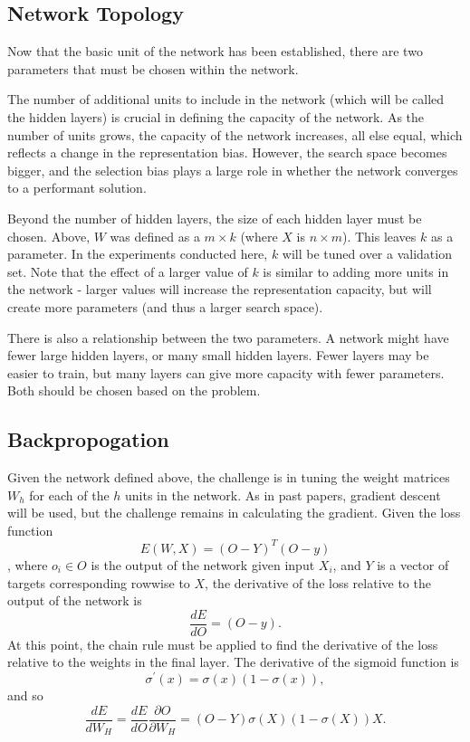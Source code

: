 \documentclass{amsart}
\begin{document}
    \subsection*{Network Topology}
    Now that the basic unit of the network has been established, there
    are two parameters that must be chosen within the network\cite{deeplearning}.

    The number of additional units to include in the network (which will be
    called the hidden layers) is crucial in defining the capacity of the
    network. As the number of units grows, the capacity of the
    network increases, all else equal, which reflects a change in the
    representation bias. However, the search space becomes bigger,
    and the selection bias plays a large role in whether the network
    converges to a performant solution.

    Beyond the number of hidden layers, the size of each
    hidden layer must be chosen.
    Above, $W$ was defined as a $m \times k$ (where $X$ is $n \times m$).
    This leaves $k$ as a parameter. In the experiments conducted here,
    $k$ will be tuned over a validation set.
    Note that the effect of a larger value of $k$ is similar to adding more
    units in the network - larger values will increase the representation
    capacity, but will create more parameters (and thus a larger search space).

    There is also a relationship between the two parameters. A network
    might have fewer large hidden layers, or many small hidden layers.
    Fewer layers may be easier to train, but many layers can give more capacity
    with fewer parameters. Both should be chosen based on the problem.

    \subsection*{Backpropogation}
    Given the network defined above, the challenge is in tuning
    the weight matrices $W_h$ for each of the $h$ units in
    the network. As in past papers, gradient descent will be
    used, but the challenge remains in calculating the gradient\cite{backprop}.
    Given the loss function
    \[
        E(W, X) = (O - Y)^T (O - y)
    \],
    where $o_i \in O$
    is the output of the network given input $X_i$, and $Y$
    is a vector of targets corresponding rowwise to $X$,
    the derivative of the loss relative to the output of the
    network is
    \[
        \frac{dE}{dO} = (O - y).
    \]
    At this point, the chain rule must be
    applied to find the derivative of the loss relative
    to the weights in the final layer.
    The derivative of the sigmoid function is
    \[
        \sigma^\prime (x) = \sigma(x) (1 - \sigma(x)),
    \]
    and so \[
        \frac{dE}{dW_H} =
        \frac{dE}{dO} \frac{\partial O}{\partial W_H} =
        (O - Y) \sigma(X) (1 - \sigma(X)) X.
    \]
\end{document}
